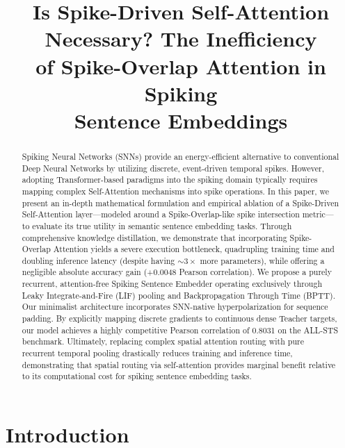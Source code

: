 \documentclass{article} %
\title{\centering Is Spike-Driven Self-Attention Necessary? The Inefficiency\\ of Spike-Overlap Attention in Spiking\\ Sentence Embeddings}
\author{\end{tabular}\hfill\begin{tabular}[t]{c}\bf\rule{0pt}{24pt}Muhammad Akhyar \\ \normalfont\texttt{akhyarsafrudin@gmail.com}\end{tabular}\hfill\begin{tabular}[t]{l}}
\begin{document}
\maketitle

\begin{abstract}
Spiking Neural Networks (SNNs) provide an energy-efficient alternative to conventional Deep Neural Networks by utilizing discrete, event-driven temporal spikes. However, adopting Transformer-based paradigms into the spiking domain typically requires mapping complex Self-Attention mechanisms into spike operations. In this paper, we present an in-depth mathematical formulation and empirical ablation of a Spike-Driven Self-Attention layer—modeled around a Spike-Overlap-like spike intersection metric—to evaluate its true utility in semantic sentence embedding tasks. Through comprehensive knowledge distillation, we demonstrate that incorporating Spike-Overlap Attention yields a severe execution bottleneck, quadrupling training time and doubling inference latency (despite having $\sim 3\times$ more parameters), while offering a negligible absolute accuracy gain (+0.0048 Pearson correlation). We propose a purely recurrent, attention-free Spiking Sentence Embedder operating exclusively through Leaky Integrate-and-Fire (LIF) pooling and Backpropagation Through Time (BPTT). Our minimalist architecture incorporates SNN-native hyperpolarization for sequence padding. By explicitly mapping discrete gradients to continuous dense Teacher targets, our model achieves a highly competitive Pearson correlation of 0.8031 on the ALL-STS benchmark. Ultimately, replacing complex spatial attention routing with pure recurrent temporal pooling drastically reduces training and inference time, demonstrating that spatial routing via self-attention provides marginal benefit relative to its computational cost for spiking sentence embedding tasks.
\end{abstract}

\section{Introduction}
\end{document}
